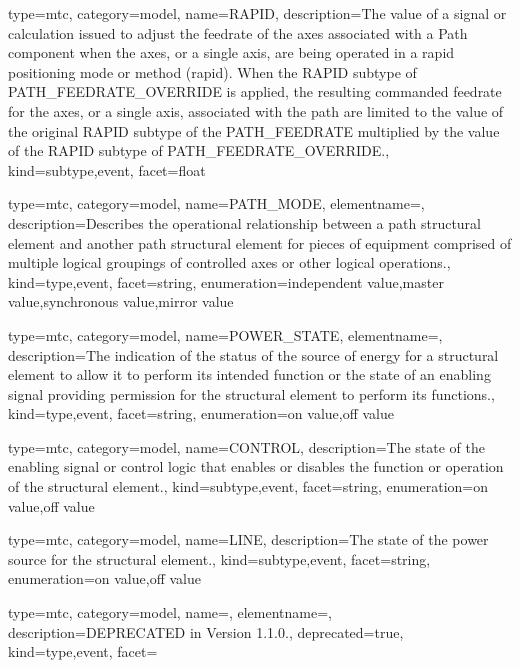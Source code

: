 {
  type=mtc,
  category=model,
  name={RAPID},
  description={The value of a signal or calculation issued to adjust the feedrate of the axes associated with a Path component when the axes, or a single axis, are being operated in a rapid positioning mode or method (rapid).   \newline When the RAPID subtype of PATH\_FEEDRATE\_OVERRIDE is applied, the resulting commanded feedrate for the axes, or a single axis, associated with the path are limited to the value of the original RAPID subtype of the PATH\_FEEDRATE multiplied by the value of the RAPID subtype of PATH\_FEEDRATE\_OVERRIDE.},
  kind={subtype,event},
  facet={\gls{float}}
}


{
  type=mtc,
  category=model,
  name={PATH\_MODE},
  elementname=,
  description={Describes the operational relationship between a \gls{path} \gls{structural element} and another \gls{path} \gls{structural element} for pieces of equipment comprised of multiple logical groupings of controlled axes or other logical operations.},
  kind={type,event},
  facet={\gls{string}},
  enumeration={\gls{independent value},\gls{master value},\gls{synchronous value},\gls{mirror value}}
}


{
  type=mtc,
  category=model,
  name={POWER\_STATE},
  elementname=,
  description={The indication of the status of the source of energy for a \gls{structural element} to allow it to perform its intended function or the state of an enabling signal providing permission for the \gls{structural element} to perform its functions.},
  kind={type,event},
  facet={\gls{string}},
  enumeration={\gls{on value},\gls{off value}}
}


{
  type=mtc,
  category=model,
  name={CONTROL},
  description={The state of the enabling signal or control logic that enables or disables the function or operation of the \gls{structural element}.},
  kind={subtype,event},
  facet={\gls{string}},
  enumeration={\gls{on value},\gls{off value}}
}


{
  type=mtc,
  category=model,
  name={LINE},
  description={The state of the power source for the \gls{structural element}.},
  kind={subtype,event},
  facet={\gls{string}},
  enumeration={\gls{on value},\gls{off value}}
}


{
  type=mtc,
  category=model,
  name=,
  elementname=,
  description={DEPRECATED in Version 1.1.0.},
  deprecated={true},
  kind={type,event},
  facet={}
}


